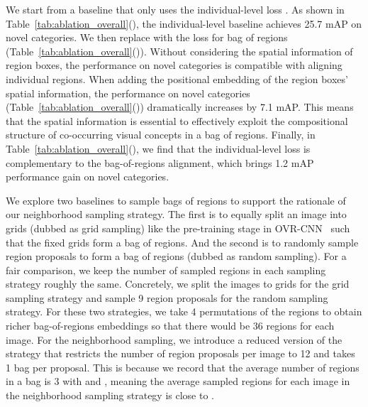  We start from a baseline that only uses the individual-level loss . As shown in Table~\ref{tab:ablation_overall}(), the individual-level baseline achieves 25.7 mAP on novel categories. We then replace   with the loss for bag of regions  (Table~\ref{tab:ablation_overall}()). Without considering the spatial information of region boxes, the performance on novel categories is compatible with aligning individual regions.
When adding the positional embedding of the region boxes' spatial information, the performance on novel categories (Table~\ref{tab:ablation_overall}()) dramatically increases by 7.1 mAP.
This means that the spatial information is essential to effectively exploit the compositional structure of co-occurring visual concepts in a bag of regions.
Finally, in Table~\ref{tab:ablation_overall}(), we find that the individual-level loss is complementary to the bag-of-regions alignment, which brings 1.2 mAP performance gain on novel categories.

We explore two baselines to sample bags of regions to support the rationale of our neighborhood sampling strategy. The first is to equally split an image into grids (dubbed as grid sampling) like the pre-training stage in OVR-CNN~\cite{zareian2021open} such that the fixed grids form a bag of regions. And the second is to
randomly sample region proposals to form a bag of regions (dubbed as random sampling). For a fair comparison, we keep the number of sampled regions in each sampling strategy roughly the same. Concretely, we split the images to  grids for the grid sampling strategy and sample 9 region proposals for the random sampling strategy. For these two strategies, we take 4 permutations of the regions to obtain richer bag-of-regions embeddings so that there would be 36 regions for each image. For the neighborhood sampling, we introduce a reduced version of the strategy that restricts the number of region proposals per image to 12 and takes 1 bag per proposal. This is because we record that the average number of regions in a bag is 3 with  and , meaning the average sampled regions for each image in the neighborhood sampling strategy is close to . 

